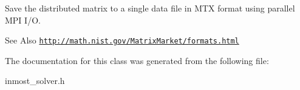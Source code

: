 Save the distributed matrix to a single data file in M\-T\-X format using parallel M\-P\-I I/\-O. 

\begin{DoxySeeAlso}{See Also}
\href{http://math.nist.gov/MatrixMarket/formats.html}{\tt http\-://math.\-nist.\-gov/\-Matrix\-Market/formats.\-html} 
\end{DoxySeeAlso}


The documentation for this class was generated from the following file\-:\begin{DoxyCompactItemize}
\item 
inmost\-\_\-solver.\-h\end{DoxyCompactItemize}
